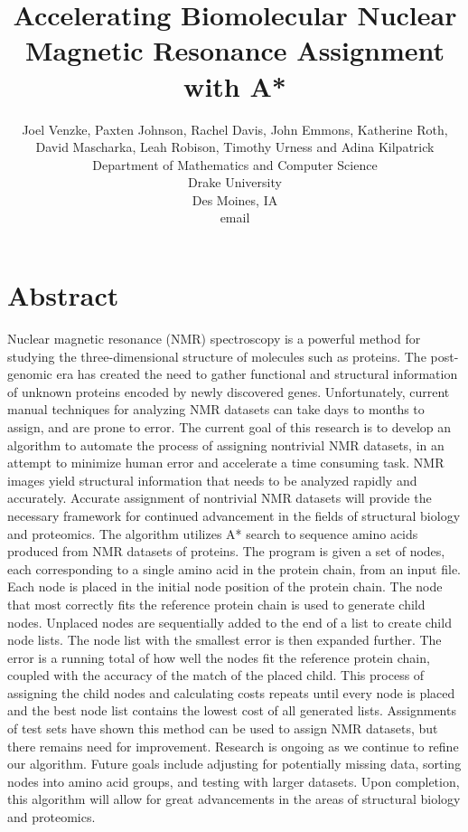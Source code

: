 \documentclass[12pt, letter]{article}
\begin{document}
\pagestyle{plain}

\title{Accelerating Biomolecular Nuclear Magnetic Resonance Assignment with A*}

\author{
Joel Venzke, Paxten Johnson, Rachel Davis, John Emmons, Katherine Roth,\\ David Mascharka, Leah Robison, Timothy Urness and Adina Kilpatrick\\
Department of Mathematics and Computer Science\\
Drake University\\
Des Moines, IA\\
email %
}
\date{} 

\maketitle
\thispagestyle{empty}

\section*{\centering Abstract}

Nuclear magnetic resonance (NMR) spectroscopy is a powerful method for studying the three-dimensional structure of molecules such as proteins. The post-genomic era has created the need to gather functional and structural information of unknown proteins encoded by newly discovered genes. Unfortunately, current manual techniques for analyzing NMR datasets can take days to months to assign, and are prone to error. The current goal of this research is to develop an algorithm to automate the process of assigning nontrivial NMR datasets, in an attempt to minimize human error and accelerate a time consuming task.
%
NMR images yield structural information that needs to be analyzed rapidly and accurately. Accurate assignment of nontrivial NMR datasets will provide the necessary framework for continued advancement in the fields of structural biology and proteomics. 
%
The algorithm utilizes A* search to sequence amino acids produced from NMR datasets of proteins. The program is given a set of nodes, each corresponding to a single amino acid in the protein chain, from an input file. Each node is placed in the initial node position of the protein chain. The node that most correctly fits the reference protein chain is used to generate child nodes. Unplaced nodes are sequentially added to the end of a list to create child node lists. The node list with the smallest error is then expanded further. The error is a running total of how well the nodes fit the reference protein chain, coupled with the accuracy of the match of the placed child. This process of assigning the child nodes and calculating costs repeats until every node is placed and the best node list contains the lowest cost of all generated lists. 
%
Assignments of test sets have shown this method can be used to assign NMR datasets, but there remains need for improvement. Research is ongoing as we continue to refine our algorithm. Future goals include adjusting for potentially missing data, sorting nodes into amino acid groups, and testing with larger datasets. Upon completion, this algorithm will allow for great advancements in the areas of structural biology and proteomics. 
\newpage
\setcounter{page}{1}
\end{document}
